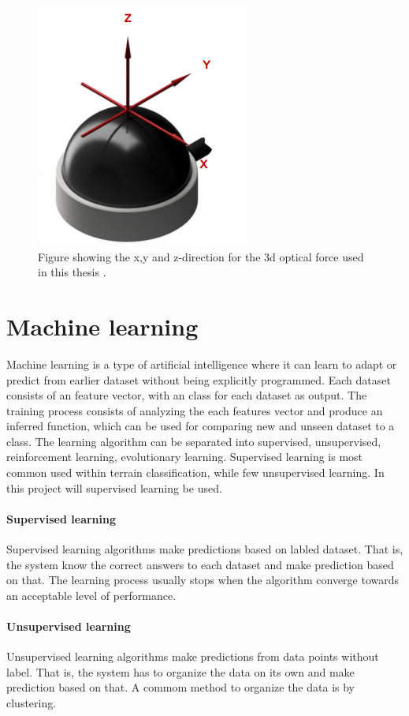 \documentclass[USenglish]{ifimaster}  %
\begin{document}
\begin{figure}[h]
    \centering
    \includegraphics[scale=0.8]{Figures/OptoforceAxis3}
    \caption{Figure showing the x,y and z-direction for the 3d optical force used in this thesis \cite{OptoforceSheet}.}
    \label{fig:OptoforceAxis}
\end{figure}

\section {Machine learning}
Machine learning is a type of artificial intelligence where it can learn to adapt or predict from earlier dataset without being explicitly programmed. Each dataset consists of an feature vector, with an class for each dataset as output. The training process consists of analyzing the each features vector and produce an inferred function, which can be used for comparing new and unseen dataset to a class. The learning algorithm can be separated into supervised, unsupervised, reinforcement learning, evolutionary learning. Supervised learning is most common used within terrain classification, while few unsupervised learning. In this project will supervised learning be used. 

\paragraph{Supervised learning}
Supervised learning algorithms make predictions based on labled dataset. That is, the system know the correct answers to each dataset and make prediction based on that. The learning process usually stops when the algorithm converge towards an acceptable level of performance.

\paragraph{Unsupervised learning}
Unsupervised learning algorithms make predictions from data points without label. That is, the system has to organize the data on its own and make prediction based on that. A commom method to organize the data is by clustering.
\end{document}
